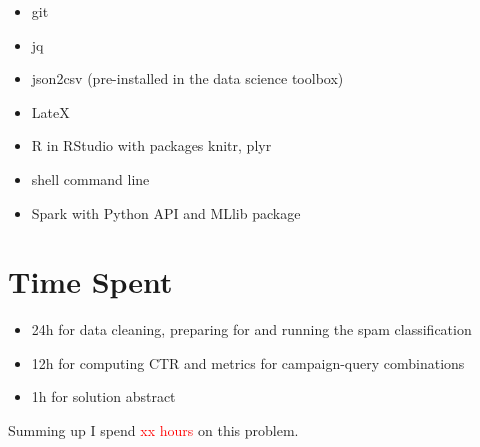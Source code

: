 \documentclass{article}\usepackage[]{graphicx}\usepackage[]{color}
\begin{document}
\begin{itemize}
	\item git
	\item jq
	\item json2csv (pre-installed in the data science toolbox)
	\item LateX
	\item R in RStudio with packages knitr, plyr
	\item shell command line
	\item Spark with Python API and MLlib package
\end{itemize}

\section{Time Spent}
\begin{itemize}
	\item 24h for data cleaning, preparing for and running the spam classification
	\item 12h for computing CTR and metrics for campaign-query combinations
	\item 1h for solution abstract
\end{itemize}

Summing up I spend \textcolor{red}{xx hours} on this problem.
\end{document}
